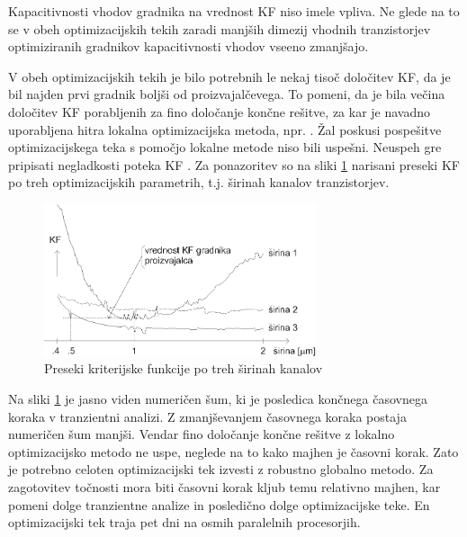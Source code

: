 \documentclass[journal,a4paper,twoside]{sty/IEEEtran}
\begin{document}
Kapacitivnosti vhodov gradnika na vrednost KF niso imele vpliva. Ne glede na to se v obeh optimizacijskih tekih zaradi manjših dimezij vhodnih tranzistorjev optimiziranih gradnikov kapacitivnosti vhodov vseeno zmanjšajo.

V obeh optimizacijskih tekih je bilo potrebnih le nekaj tisoč določitev KF, da je bil najden prvi gradnik boljši od proizvajalčevega. To pomeni, da je bila večina določitev KF porabljenih za fino določanje končne rešitve, za kar je navadno uporabljena hitra lokalna optimizacijska metoda, npr. \cite{hooke}. Žal poskusi pospešitve optimizacijskega teka s pomočjo lokalne metode niso bili uspešni. Neuspeh gre pripisati negladkosti poteka KF \cite{burmen2}. Za ponazoritev so na sliki \ref{cost_profile} narisani preseki KF po treh optimizacijskih parametrih, t.j. širinah kanalov tranzistorjev.

\begin{figure}[htb]
\centerline{\includegraphics[width=8cm]{fig/cost_profile_slo}}
\caption{Preseki kriterijske funkcije po treh širinah kanalov}
\label{cost_profile}
\end{figure}

Na sliki \ref{cost_profile} je jasno viden numeričen šum, ki je posledica končnega časovnega koraka v tranzientni analizi. Z zmanjševanjem časovnega koraka postaja numeričen šum manjši. Vendar fino določanje končne rešitve z lokalno optimizacijsko metodo ne uspe, neglede na to kako majhen je  časovni korak. Zato je potrebno celoten optimizacijski tek izvesti z robustno globalno metodo. Za zagotovitev točnosti mora biti časovni korak kljub temu relativno majhen, kar pomeni dolge tranzientne analize in posledično dolge optimizacijske teke. En optimizacijski tek traja pet dni na osmih paralelnih procesorjih.
\end{document}
